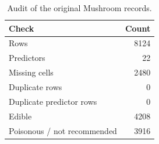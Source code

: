 \begin{table}[H]
\centering\small
\caption{Audit of the original Mushroom records.}
\begin{tabular}{lr}
\toprule
Check & Count \\
\midrule
Rows & 8124 \\
Predictors & 22 \\
Missing cells & 2480 \\
Duplicate rows & 0 \\
Duplicate predictor rows & 0 \\
Edible & 4208 \\
Poisonous / not recommended & 3916 \\
\bottomrule
\end{tabular}
\end{table}
